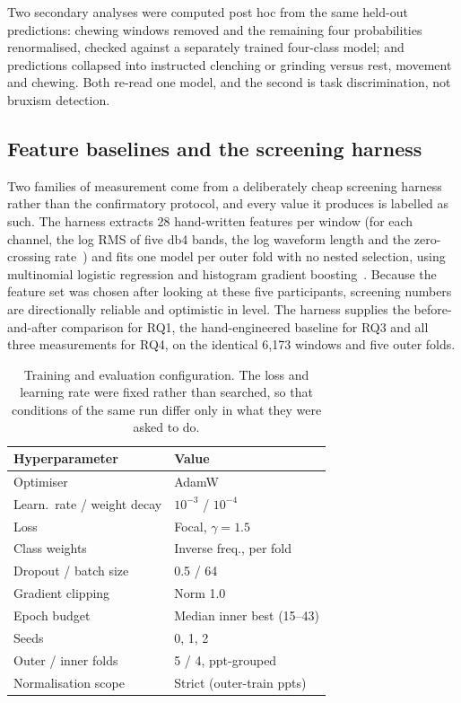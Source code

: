 \documentclass[pdflatex,sn-nature,iicol]{sn-jnl}
\begin{document}
Two secondary analyses were computed post hoc from the same held-out predictions: chewing windows removed and the remaining four probabilities renormalised, checked against a separately trained four-class model; and predictions collapsed into instructed clenching or grinding versus rest, movement and chewing. Both re-read one model, and the second is task discrimination, not bruxism detection.

\subsection{Feature baselines and the screening harness}
\label{sec:screening}

Two families of measurement come from a deliberately cheap screening harness rather than the confirmatory protocol, and every value it produces is labelled as such. The harness extracts 28 hand-written features per window (for each channel, the log RMS of five db4 bands, the log waveform length and the zero-crossing rate~\cite{phinyomark2012feature}) and fits one model per outer fold with no nested selection, using multinomial logistic regression and histogram gradient boosting~\cite{pedregosa2011scikit}. Because the feature set was chosen after looking at these five participants, screening numbers are directionally reliable and optimistic in level. The harness supplies the before-and-after comparison for RQ1, the hand-engineered baseline for RQ3 and all three measurements for RQ4, on the identical 6,173 windows and five outer folds.

\begin{table}[t]
  \caption{Training and evaluation configuration. The loss and learning rate were fixed rather than searched, so that conditions of the same run differ only in what they were asked to do.}
  \label{tab:hyperparameters}
  \centering
  \footnotesize
  \begin{tabular*}{\columnwidth}{@{\extracolsep{\fill}}ll@{}}
    \toprule
    Hyperparameter & Value \\
    \midrule
    Optimiser & AdamW \\
    Learn.\ rate / weight decay & $10^{-3}$ / $10^{-4}$ \\
    Loss & Focal, $\gamma = 1.5$ \\
    Class weights & Inverse freq., per fold \\
    Dropout / batch size & 0.5 / 64 \\
    Gradient clipping & Norm 1.0 \\
    Epoch budget & Median inner best (15--43) \\
    Seeds & 0, 1, 2 \\
    Outer / inner folds & 5 / 4, ppt-grouped \\
    Normalisation scope & Strict (outer-train ppts) \\
    \bottomrule
  \end{tabular*}
\end{table}
\end{document}
